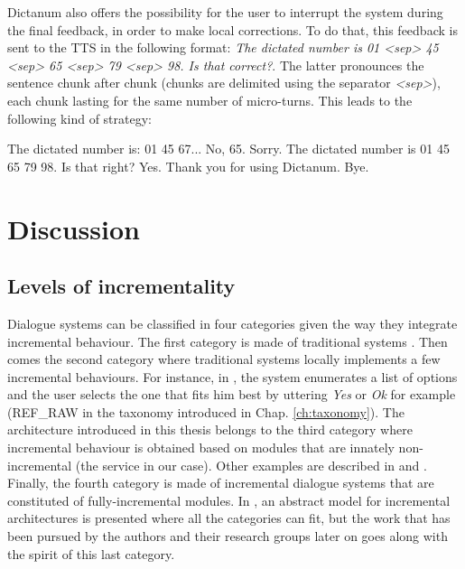         Dictanum also offers the possibility for the user to interrupt the system during the final feedback, in order to make local corrections. To do that, this feedback is sent to the TTS in the following format: \textit{The dictated number is 01 <sep> 45 <sep> 65 <sep> 79 <sep> 98. Is that correct?}. The latter pronounces the sentence chunk after chunk (chunks are delimited using the separator \textit{<sep>}), each chunk lasting for the same number of micro-turns. This leads to the following kind of strategy:
        
        \begin{dialogue}
             The dictated number is: 01 45 67...
             No, 65.
             Sorry. The dictated number is 01 45 65 79 98. Is that right?
             Yes.
             Thank you for using Dictanum. Bye.
        \end{dialogue}
    
\section{Discussion}

	\subsection{Levels of incrementality}
    
    	Dialogue systems can be classified in four categories given the way they integrate incremental behaviour. The first category is made of traditional systems \cite{CLASSiCd64}. Then comes the second category where traditional systems locally implements a few incremental behaviours. For instance, in \cite{El-Asri2014a}, the system enumerates a list of options and the user selects the one that fits him best by uttering \textit{Yes} or \textit{Ok} for example (REF\_RAW in the taxonomy introduced in Chap. \ref{ch:taxonomy}). The architecture introduced in this thesis belongs to the third category where incremental behaviour is obtained based on modules that are innately non-incremental (the service in our case). Other examples are described in \cite{Selfridge2012a} and \cite{Hastie2013}. Finally, the fourth category is made of incremental dialogue systems that are constituted of fully-incremental modules. In \cite{Schlangen2011}, an abstract model for incremental architectures is presented where all the categories can fit, but the work that has been pursued by the authors and their research groups later on goes along with the spirit of this last category.
		
